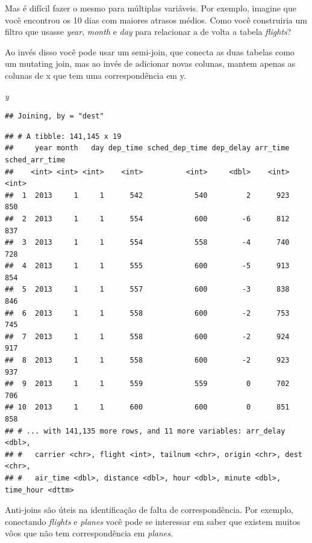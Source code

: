 \documentclass[
]{article}
\newenvironment{Shaded}{\begin{snugshade}}{\end{snugshade}}
\newcommand{\KeywordTok}[1]{\textcolor[rgb]{0.13,0.29,0.53}{\textbf{#1}}}
\newcommand{\NormalTok}[1]{#1}
\newcommand{\OperatorTok}[1]{\textcolor[rgb]{0.81,0.36,0.00}{\textbf{#1}}}
\newcommand{\StringTok}[1]{\textcolor[rgb]{0.31,0.60,0.02}{#1}}
\begin{document}
Mas é difícil fazer o mesmo para múltiplas variáveis. Por exemplo,
imagine que você encontrou os 10 dias com maiores atrasos médios. Como
você construiria um filtro que usasse \emph{year}, \emph{month} e
\emph{day} para relacionar a de volta a tabela \emph{flights}?

Ao invés disso você pode usar um semi-join, que conecta as duas tabelas
como um mutating join, mas ao invés de adicionar novas colunas, mantem
apenas as colunas de x que tem uma correspondência em y.

\emph{y}

\begin{Shaded}
\end{Shaded}

\begin{verbatim}
## Joining, by = "dest"
\end{verbatim}

\begin{verbatim}
## # A tibble: 141,145 x 19
##     year month   day dep_time sched_dep_time dep_delay arr_time sched_arr_time
##    <int> <int> <int>    <int>          <int>     <dbl>    <int>          <int>
##  1  2013     1     1      542            540         2      923            850
##  2  2013     1     1      554            600        -6      812            837
##  3  2013     1     1      554            558        -4      740            728
##  4  2013     1     1      555            600        -5      913            854
##  5  2013     1     1      557            600        -3      838            846
##  6  2013     1     1      558            600        -2      753            745
##  7  2013     1     1      558            600        -2      924            917
##  8  2013     1     1      558            600        -2      923            937
##  9  2013     1     1      559            559         0      702            706
## 10  2013     1     1      600            600         0      851            858
## # ... with 141,135 more rows, and 11 more variables: arr_delay <dbl>,
## #   carrier <chr>, flight <int>, tailnum <chr>, origin <chr>, dest <chr>,
## #   air_time <dbl>, distance <dbl>, hour <dbl>, minute <dbl>, time_hour <dttm>
\end{verbatim}

Anti-joins são úteis na identificação de falta de correspondência. Por
exemplo, conectando \emph{flights} e \emph{planes} você pode se
interessar em saber que existem muitos vôos que não tem correspondência
em \emph{planes}.
\end{document}
